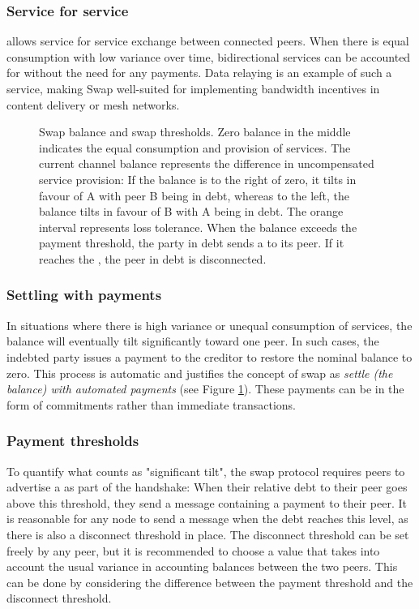 \subsubsection{Service for service}

 allows service for service exchange between connected peers. When there is equal consumption with low variance over time, bidirectional services can be accounted for without the need for any payments. Data relaying is an example of such a service, making Swap well-suited for implementing bandwidth incentives in content delivery or mesh networks.

\begin{figure}[htbp]

\caption[Swap balance and swap thresholds \statusgreen]{Swap balance and swap thresholds.
Zero balance in the middle indicates the equal consumption and provision of services.
The current channel balance represents the difference in uncompensated service provision:
If the balance is to the right of zero, it tilts in favour of A with peer B being in debt, whereas to the left,
the balance tilts in favour of B with A being in debt.
The orange interval represents loss tolerance. When the balance exceeds the payment threshold, the party in
debt sends a  to its peer. If it reaches the , the peer in debt is disconnected.}
\label{fig:swap}
\end{figure}

\subsubsection{Settling with payments}

In situations where there is high variance or unequal consumption of services, the balance will eventually tilt significantly toward one peer. In such cases, the indebted party issues a payment to the creditor to restore the nominal balance to zero. This process is automatic and justifies the concept of swap as \emph{settle (the balance) with automated payments} (see Figure \ref{fig:swap}). These payments can be in the form of commitments rather than immediate transactions.


\subsubsection{Payment thresholds}

To quantify what counts as "significant tilt", the swap protocol requires peers to advertise a  as part of the handshake: When their relative debt to their peer goes above this threshold, they send a message containing a payment to their peer. It is reasonable for any node to send a message when the debt reaches this level, as there is also a disconnect threshold in place. The disconnect threshold can be set freely by any peer, but it is recommended to choose a value that takes into account the usual 
variance in accounting balances between the two peers. This can be done by considering the difference between the payment threshold and the disconnect threshold.


